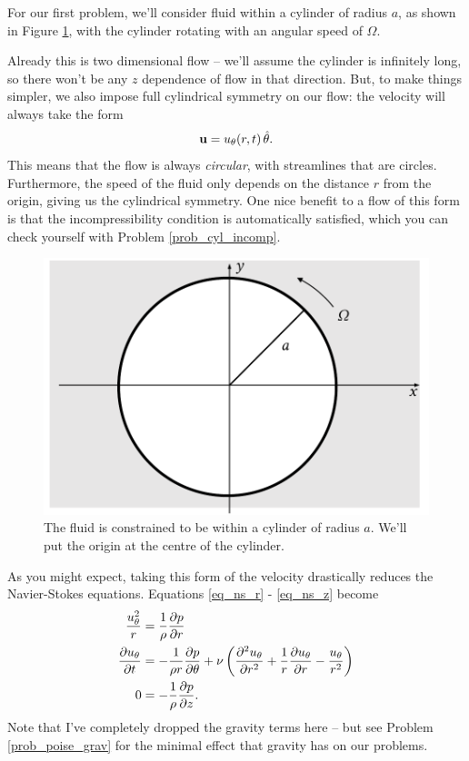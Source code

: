 For our first problem, we'll consider fluid within a cylinder of radius $a$, as shown in Figure \ref{fig_cyl_setup}, with the cylinder rotating with an angular speed of $\Omega$. 

Already this is two dimensional flow -- we'll assume the cylinder is infinitely long, so there won't be any $z$ dependence of flow in that direction.  But, to make things simpler, we also impose full cylindrical symmetry on our flow:  the velocity will always take the form
\begin{equation}
\mathbf{u} = u_\theta (r, t) \, \hat{\theta}.
\end{equation}
This means that the flow is always \emph{circular}, with streamlines that are circles.  Furthermore, the speed of the fluid only depends on the distance $r$ from the origin, giving us the cylindrical symmetry.  One nice benefit to a flow of this form is that the incompressibility condition is automatically satisfied, which you can check yourself with Problem \ref{prob_cyl_incomp}.

\begin{figure}
\centering
\includegraphics[width=0.7\linewidth]{Figures/Chapter2/fig_cyl_setup}
\caption{The fluid is constrained to be within a cylinder of radius $a$.  We'll put the origin at the centre of the cylinder.}
\label{fig_cyl_setup}
\end{figure}

As you might expect, taking this form of the velocity drastically reduces the Navier-Stokes equations.  Equations \ref{eq_ns_r} - \ref{eq_ns_z} become
\begin{align}
\frac{u_\theta^2}{r} & = \frac{1}{\rho} \frac{\partial {p}}{\partial {r}} \\
\label{eq_ns_theta2}
\frac{\partial {u_\theta}}{\partial {t}} & = -\frac{1}{\rho r} \frac{\partial {p}}{\partial {\theta}} + \nu \left( \frac{\partial^2 {u_\theta}}{\partial {r}^2} + \frac{1}{r} \frac{\partial {u_\theta}}{\partial {r}} - \frac{u_\theta}{r^2} \right) \\
\label{eq_ns_z2}
0 & = -\frac{1}{\rho} \frac{\partial {p}}{\partial {z}}.
\end{align}
Note that I've completely dropped the gravity terms here -- but see Problem \ref{prob_poise_grav} for the minimal effect that gravity has on our problems.

